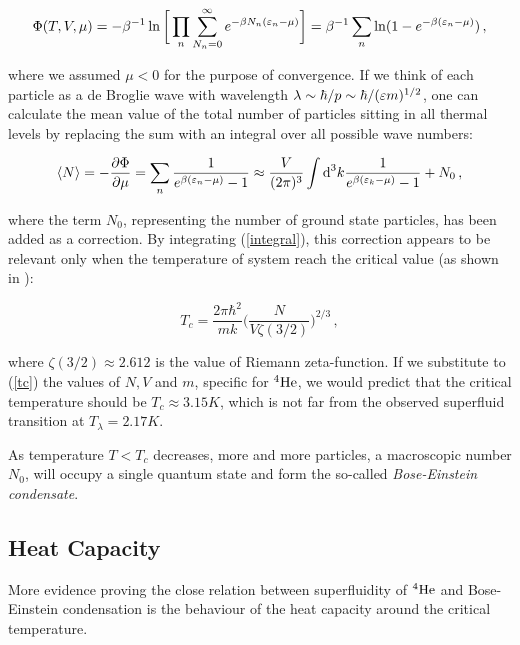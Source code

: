 \begin{equation}
\Phi (T, V, \mu) 
=-\beta^{-1} \ln \bigg[\displaystyle \prod_{n}
  \displaystyle \sum_{N_n=0}^{\infty}
  e^{-\beta N_n (\varepsilon_n - \mu) } \bigg]
= \beta^{-1} \displaystyle \sum_{n} \ln (1 - e^{-\beta (\varepsilon_n - \mu)})\,,
\label{partition}
\end{equation}

where we assumed $\mu<0$ for the purpose of convergence. If we think of each particle as a de Broglie wave with wavelength $\lambda \sim \hbar/p \sim \hbar/(\varepsilon m)^{1/2}$, one can calculate the mean value of the total number of particles sitting in all thermal levels by replacing the sum with an integral over all possible wave numbers:

\begin{equation}
\langle N\rangle = -\frac{\partial\Phi}{\partial\mu} 
= \sum_n \frac{1}{e^{\beta(\varepsilon_n-\mu)}-1}
\approx
\frac{V}{(2\pi)^3}\int \text{d}^3k \frac{1}{e^{\beta(\varepsilon_k-\mu)}-1} + N_0\,,
\label{integral}
\end{equation}

where the term $N_0$, representing the number of ground state particles, has been added as a correction. 
By integrating (\ref{integral}), this correction appears to be relevant only when the temperature of system reach the critical value (as shown in \cite{tong}):

\begin{equation}
T_c = \frac{2\pi \hbar^2}{mk} \bigg ( \frac{N}{V \zeta(3/2)}\bigg)^{2/3}\,,
\label{tc}
\end{equation}

where $\zeta(3/2)\approx 2.612$ is the value of Riemann zeta-function. If we substitute to (\ref{tc}) the values of $ N, V$ and $ m $, specific for $ {}^4\mathrm{He} $, we would predict that the critical temperature  should be $ T_c \approx 3.15\unit{K} $, which is not far from the observed superfluid transition at $ T_{\lambda} = 2.17 \unit{K} $. 

As temperature $T<T_c$ decreases, more and more particles, a macroscopic number $N_0$, will occupy a single quantum state and form the so-called \textit{Bose-Einstein condensate}.


\subsection*{Heat Capacity}
More evidence proving the close relation between superfluidity of $ {}^4\mathrm{He} $  and Bose-Einstein condensation is the behaviour of the heat capacity around the critical temperature.

